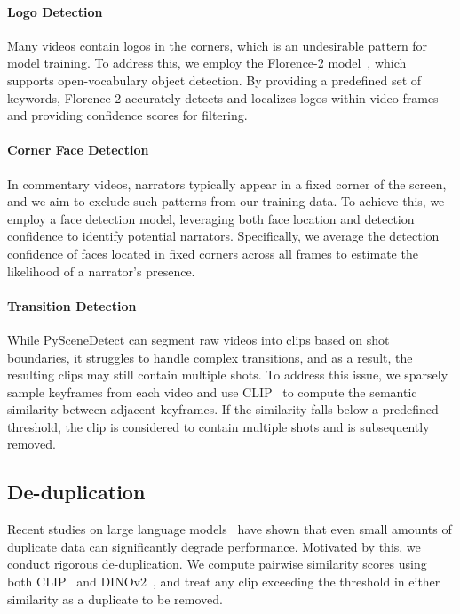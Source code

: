 \paragraph{Logo Detection}
Many videos contain logos in the corners, which is an undesirable pattern for model training. To address this, we employ the Florence-2 model~\citep{xiao2024florence}, which supports open-vocabulary object detection. By providing a predefined set of keywords, Florence-2 accurately detects and localizes logos within video frames and providing confidence scores for filtering.

\paragraph{Corner Face Detection}
In commentary videos, narrators typically appear in a fixed corner of the screen, and we aim to exclude such patterns from our training data. To achieve this, we employ a face detection model, leveraging both face location and detection confidence to identify potential narrators. Specifically, we average the detection confidence of faces located in fixed corners across all frames to estimate the likelihood of a narrator's presence.

\paragraph{Transition Detection}
While PySceneDetect can segment raw videos into clips based on shot boundaries, it struggles to handle complex transitions, and as a result, the resulting clips may still contain multiple shots. To address this issue, we sparsely sample keyframes from each video and use CLIP~\citep{radford2021learning} to compute the semantic similarity between adjacent keyframes. If the similarity falls below a predefined threshold, the clip is considered to contain multiple shots and is subsequently removed.

\subsection{De-duplication}
Recent studies on large language models~\citep{lee2021deduplicating,hernandez2022scaling} have shown that even small amounts of duplicate data can significantly degrade performance. Motivated by this, we conduct rigorous de-duplication. We compute pairwise similarity scores using both CLIP~\citep{radford2021learning} and DINOv2~\citep{oquab2023dinov2}, and treat any clip exceeding the threshold in either similarity as a duplicate to be removed.


